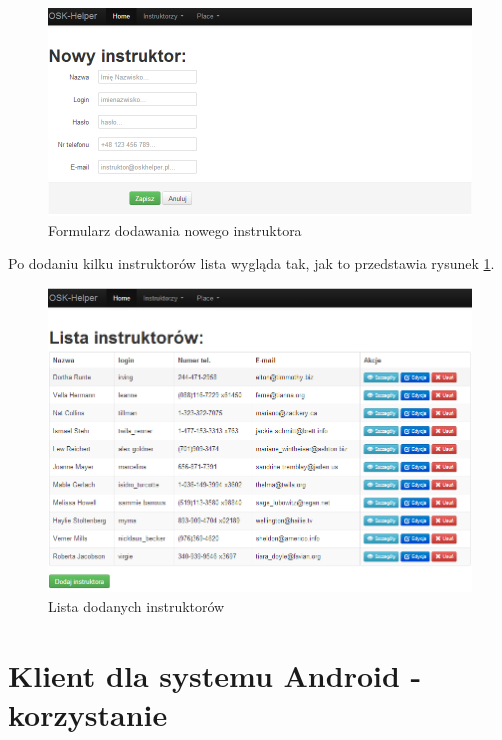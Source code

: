 \documentclass[twoside,a4paper,openright,12pt]{book}
\begin{document}
\begin{figure}[H]
\centering
\includegraphics[width=1\textwidth]{screenshots/panel/nowy_instruktor.png}
\caption{Formularz dodawania nowego instruktora}
\label{fig:Nowy_instruktor}
\end{figure}

\newpage
Po dodaniu kilku instruktorów lista wygląda tak, jak to przedstawia rysunek \ref{fig:Nowy_instruktor}.

\begin{figure}[H]
\centering
\includegraphics[width=1\textwidth]{screenshots/panel/lista_instruktorow.png}
\caption{Lista dodanych instruktorów}
\end{figure}


\chapter{Klient dla systemu Android - korzystanie}
\end{document}
